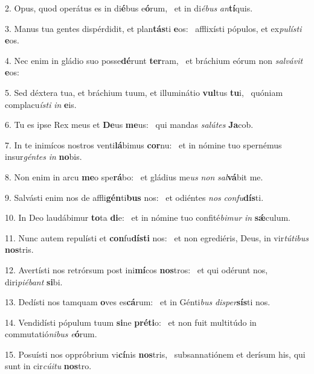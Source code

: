 2. Opus, quod operátus es in di\textbf{é}bus e\textbf{ó}rum, \ast\  et in di\textit{é}\textit{bus} \textit{an}\textbf{tí}quis.\

3. Manus tua gentes dispérdidit, et plan\textbf{tás}ti \textbf{e}os: \ast\  afflixísti pópulos, et ex\textit{pu}\textit{lís}\textit{ti} \textbf{e}os.\

4. Nec enim in gládio suo posse\textbf{dé}runt \textbf{ter}ram, \ast\  et bráchium eórum non \textit{sal}\textit{vá}\textit{vit} \textbf{e}os:\

5. Sed déxtera tua, et bráchium tuum, et illuminátio \textbf{vul}tus \textbf{tu}i, \ast\  quóniam complacu\textit{ís}\textit{ti} \textit{in} \textbf{e}is.\

6. Tu es ipse Rex meus et \textbf{De}us \textbf{me}us: \ast\  qui mandas \textit{sa}\textit{lú}\textit{tes} \textbf{Ja}cob.\

7. In te inimícos nostros venti\textbf{lá}bimus \textbf{cor}nu: \ast\  et in nómine tuo spernémus insur\textit{gén}\textit{tes} \textit{in} \textbf{no}bis.\

8. Non enim in arcu \textbf{me}o spe\textbf{rá}bo: \ast\  et gládius me\textit{us} \textit{non} \textit{sal}\textbf{vá}bit me.\

9. Salvásti enim nos de affli\textbf{gén}ti\textbf{bus} nos: \ast\  et odiéntes \textit{nos} \textit{con}\textit{fu}\textbf{dís}ti.\

10. In Deo laudábimur \textbf{to}ta \textbf{di}e: \ast\  et in nómine tuo confité\textit{bi}\textit{mur} \textit{in} \textbf{sǽ}culum.\

11. Nunc autem repulísti et \textbf{con}fu\textbf{dís}\textbf{ti} nos: \ast\  et non egrediéris, Deus, in vir\textit{tú}\textit{ti}\textit{bus} \textbf{nos}tris.\

12. Avertísti nos retrórsum post ini\textbf{mí}cos \textbf{nos}tros: \ast\  et qui odérunt nos, diri\textit{pi}\textit{é}\textit{bant} \textbf{si}bi.\

13. Dedísti nos tamquam \textbf{o}ves es\textbf{cá}rum: \ast\  et in Génti\textit{bus} \textit{di}\textit{sper}\textbf{sís}ti nos.\

14. Vendidísti pópulum tuum \textbf{si}ne \textbf{pré}\textbf{ti}o: \ast\  et non fuit multitúdo in commutatió\textit{ni}\textit{bus} \textit{e}\textbf{ó}rum.\

15. Posuísti nos oppróbrium vi\textbf{cí}nis \textbf{nos}tris, \ast\  subsannatiónem et derísum his, qui sunt in cir\textit{cú}\textit{i}\textit{tu} \textbf{nos}tro.\

